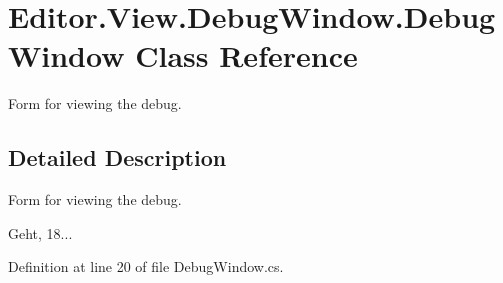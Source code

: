 \section{Editor.\-View.\-Debug\-Window.\-Debug\-Window Class Reference}
\label{class_editor_1_1_view_1_1_debug_window_1_1_debug_window}


Form for viewing the debug.  




\subsection{Detailed Description}
Form for viewing the debug. 

Geht, 18... 

Definition at line 20 of file Debug\-Window.\-cs.

